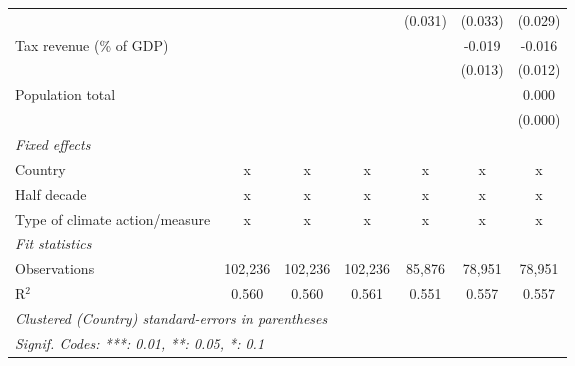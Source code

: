 \begin{tabular}{lcccccc}
                                             &             &               &               & (0.031)       & (0.033)       & (0.029)\\   
   Tax revenue (\% of GDP)                   &             &               &               &               & -0.019        & -0.016\\   
                                             &             &               &               &               & (0.013)       & (0.012)\\   
   Population total                          &             &               &               &               &               & 0.000\\   
                                             &             &               &               &               &               & (0.000)\\   
   \emph{Fixed effects}\\
   Country                                   & x           & x             & x             & x             & x             & x\\  
   Half decade                               & x           & x             & x             & x             & x             & x\\  
   Type of climate action/measure            & x           & x             & x             & x             & x             & x\\  
   \midrule \emph{Fit statistics}\\
   Observations                              & 102,236     & 102,236       & 102,236       & 85,876        & 78,951        & 78,951\\  
   R$^2$                                     & 0.560       & 0.560         & 0.561         & 0.551         & 0.557         & 0.557\\  
   \midrule
   \multicolumn{7}{l}{\emph{Clustered (Country) standard-errors in parentheses}}\\
   \multicolumn{7}{l}{\emph{Signif. Codes: ***: 0.01, **: 0.05, *: 0.1}}\\
\end{tabular}
\par\endgroup



